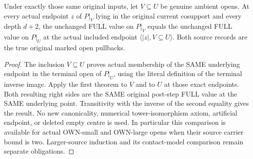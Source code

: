 \begin{theorem}
\label{hir:original-prepared-bound-two-nested-open-full-locality}
\leanok
Under exactly those same original inputs, let $V\subseteq U$ be genuine
ambient opens. At every actual endpoint $z$ of $P|_V$ lying in the
original current cosupport and every depth $d+2$, the unchanged FULL
value on $P|_V$ equals the unchanged FULL value on $P|_U$ at the actual
included endpoint $\langle |z|,V\subseteq U\rangle$.
Both source records are the true original marked open pullbacks.
\end{theorem}
\begin{proof}
The inclusion $V\subseteq U$ proves actual membership of the SAME
underlying endpoint in the terminal open of $P|_U$, using the literal
definition of the terminal inverse image. Apply the first theorem to
$V$ and to $U$ at those exact endpoints. Both resulting right sides are
the SAME original post-step FULL value at the SAME underlying point.
Transitivity with the inverse of the second equality gives the result.
No new canonicality, numerical tower-isomorphism axiom, artificial
endpoint, or deleted empty centre is used. In particular this comparison
is available for actual OWN-small and OWN-large opens when their source
carrier bound is two. Larger-source induction and its contact-model
comparison remain separate obligations.
\end{proof}
